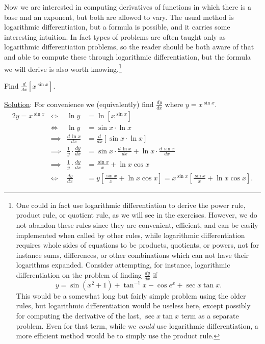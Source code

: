 Now we are interested in computing derivatives of functions in which
there is a base and an exponent, but both are allowed to vary.
The usual method is logarithmic differentiation, but a formula
is possible, and it carries some interesting intuition.  In fact
types of problems are often taught only as logarithmic differentiation
problems, so the reader should be both aware of that and able to 
compute these through logarithmic differentiation, but the formula
we will derive is also worth knowing.\footnote{%
One could in fact use logarithmic differentiation to 
derive the power rule, product rule, or quotient rule,
as we will see in the exercises.  However, we do not abandon
these rules since they are convenient, efficient, and 
can be easily implemented when called by other rules, while
logarithmic differentiation requires whole sides of equations
to be products, quotients, or powers, not for instance sums,
differences, or other combinations which can not have their
logarithms expanded.  Consider attempting, for instance,
logarithmic differentiation on the problem of finding $\frac{dy}{dx}$
if 
$$y=\sin\left(x^2+1\right)+\tan^{-1}x-\cos e^x+\sec x\tan x.$$
This would be a somewhat long but
fairly simple problem using the older rules, but
logarithmic differentiation would be useless here, except
possibly for computing the derivative of the last,
$\sec x\tan x$ term as a separate
problem.  Even for that term, while we {\it could} use logarithmic
differentiation, a more efficient method would be to simply use
the product rule.
}

\bex  Find $\frac{d}{dx}\left[x^{\sin x}\right]$.

\underline{Solution}:  For convenience we 
(equivalently) find $\frac{dy}{dx}$ where $y=x^{\sin x}$.
\begin{alignat*}{2}
y=x^{\sin x}&\iff &\ln y&=\ln\left[x^{\sin x}\right]\\
           &\iff& \ln y&=\sin x\cdot\ln x\\
           &\implies&\frac{d\,\ln x}{dx}&
                  =\frac{d}{dx}\left[\sin x\cdot\ln x\right]\\
           &\implies&\frac1y\cdot\frac{dy}{dx}&
                  =\sin x\cdot\frac{d\,\ln x}{dx}
               +\ln x\cdot\frac{d\,\sin x}{dx}\\
           &\implies&\frac1y\cdot\frac{dy}{dx}
             &=\frac{\sin x}x+\ln x\cos x\\
           &\iff&\frac{dy}{dx}&=
            y\left[\frac{\sin x}x+\ln x\cos x\right]
            =x^{\sin x}\left[\frac{\sin x}x+\ln x\cos x\right].
\end{alignat*}

